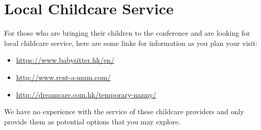 \setheaders{}{}
\section{Local Childcare Service}{}

For those who are bringing their children to the conference and are looking for local childcare service, here are some links for information as you plan your visit:
\begin{itemize}
\item \url{https://www.babysitter.hk/en/}
\item \url{http://www.rent-a-mum.com/}
\item \url{http://dreamcare.com.hk/temporary-nanny/}
\end{itemize}

We have no experience with the service of these childcare providers and only provide them as potential options that you may explore.

